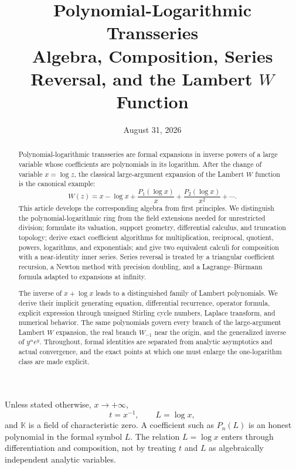 \documentclass[11pt]{article}
\title{\textbf{Polynomial-Logarithmic Transseries}\\[0.3em]
\Large Algebra, Composition, Series Reversal, and the Lambert \(W\) Function}
\author{}
\date{August 31, 2026}
\theoremstyle{pltheorem}
\newcommand{\K}{\mathbb K}
\begin{document}
\maketitle
\vspace{-2.0em}

\begin{abstract}
Polynomial-logarithmic transseries are formal expansions in inverse powers of a large variable whose coefficients are polynomials in its logarithm.  After the change of variable
\(x=\log z\), the classical large-argument expansion of the Lambert \(W\) function is the canonical example:
\[
 W(z)=x-\log x+\frac{P_1(\log x)}{x}
      +\frac{P_2(\log x)}{x^2}+\cdots .
\]
This article develops the corresponding algebra from first principles.  We distinguish the polynomial-logarithmic ring from the field extensions needed for unrestricted division; formulate its valuation, support geometry, differential calculus, and truncation topology; derive exact coefficient algorithms for multiplication, reciprocal, quotient, powers, logarithms, and exponentials; and give two equivalent calculi for composition with a near-identity inner series.  Series reversal is treated by a triangular coefficient recursion, a Newton method with precision doubling, and a Lagrange--B\"urmann formula adapted to expansions at infinity.

The inverse of \(x+\log x\) leads to a distinguished family of Lambert polynomials.  We derive their implicit generating equation, differential recurrence, operator formula, explicit expression through unsigned Stirling cycle numbers, Laplace transform, and numerical behavior.  The same polynomials govern every branch of the large-argument Lambert \(W\) expansion, the real branch \(W_{-1}\) near the origin, and the generalized inverse of \(y^\alpha e^y\).  Throughout, formal identities are separated from analytic asymptotics and actual convergence, and the exact points at which one must enlarge the one-logarithm class are made explicit.
\end{abstract}

\begin{keybox}
Unless stated otherwise, \(x\to+\infty\),
\[
 t=x^{-1},\qquad L=\log x,
\]
and \(\K\) is a field of characteristic zero.  A coefficient such as \(P_n(L)\) is an honest polynomial in the formal symbol \(L\).  The relation \(L=\log x\) enters through differentiation and composition, not by treating \(t\) and \(L\) as algebraically independent analytic variables.
\end{keybox}
\end{document}
